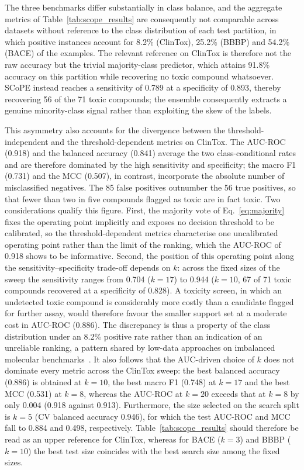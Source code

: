 The three benchmarks differ substantially in class balance, and the aggregate
metrics of Table~\ref{tab:scope_results} are consequently not comparable across
datasets without reference to the class distribution of each test partition, in
which positive instances account for 8.2\% (ClinTox), 25.2\% (BBBP) and 54.2\%
(BACE) of the examples. The relevant reference on ClinTox is therefore not the
raw accuracy but the trivial majority-class predictor, which attains 91.8\%
accuracy on this partition while recovering no toxic compound whatsoever. SCoPE
instead reaches a sensitivity of 0.789 at a specificity of 0.893, thereby
recovering 56 of the 71 toxic compounds; the ensemble consequently extracts a
genuine minority-class signal rather than exploiting the skew of the labels.

This asymmetry also accounts for the divergence between the
threshold-independent and the threshold-dependent metrics on ClinTox. The
AUC-ROC (0.918) and the balanced accuracy (0.841) average the two
class-conditional rates and are therefore dominated by the high sensitivity and
specificity; the macro F1 (0.731) and the MCC (0.507), in contrast, incorporate
the absolute number of misclassified negatives. The 85 false positives
outnumber the 56 true positives, so that fewer than two in five compounds
flagged as toxic are in fact toxic. Two considerations qualify this figure. First, the majority vote of
Eq.~\eqref{eq:majority} fixes the operating point implicitly and exposes no
decision threshold to be calibrated, so the threshold-dependent metrics
characterise one uncalibrated operating point rather than the limit of the
ranking, which the AUC-ROC of 0.918 shows to be informative. Second, the
position of this operating point along the sensitivity--specificity trade-off
depends on $k$: across the fixed sizes of the sweep the sensitivity ranges from
0.704 ($k=17$) to 0.944 ($k=10$, 67 of 71 toxic compounds recovered at a
specificity of 0.828). A toxicity screen, in which an undetected toxic compound
is considerably more costly than a candidate flagged for further assay, would
therefore favour the smaller support set at a moderate cost in AUC-ROC (0.886).
The discrepancy is thus a property of the class distribution under an 8.2\% positive
rate rather than an indication of an unreliable ranking, a pattern shared by
low-data approaches on imbalanced molecular
benchmarks~\cite{zhang2024molfescue,wu2018moleculenet}. It
also follows that the AUC-driven choice of $k$ does not dominate every metric
across the ClinTox sweep: the best balanced accuracy (0.886) is obtained at
$k=10$, the best macro F1 (0.748) at $k=17$ and the best MCC (0.531) at $k=8$,
whereas the AUC-ROC at $k=20$ exceeds that at $k=8$ by only 0.004 (0.918
against 0.913).
Furthermore, the size selected on the search split is $k=5$ (CV balanced
accuracy 0.946), for which the test AUC-ROC and MCC fall to 0.884 and 0.498,
respectively. Table~\ref{tab:scope_results} should therefore be read as an upper
reference for ClinTox, whereas for BACE ($k=3$) and BBBP ($k=10$) the best test
size coincides with the best search size among the fixed sizes.

